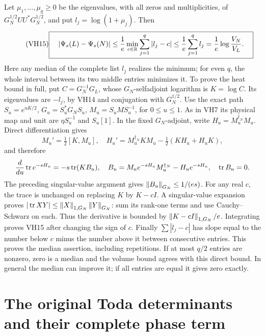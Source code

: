 Let \(\mu_1,\ldots,\mu_q\ge0\) be the eigenvalues, with all zeros
and multiplicities, of \(G_N^{1/2}UU^*G_N^{1/2}\), and put
\(l_j=\log(1+\mu_j)\). Then
\begin{equation}\tag{VH15}\label{hvh:VH15}
\boxed{\quad
|\Psi_s(L)-\Psi_s(N)|
\le\frac1e\min_{c\in\mathbb R}\sum_{j=1}^q|l_j-c|
\le\frac1e\sum_{j=1}^q l_j
=\frac1e\log\frac{V_N}{V_L}.\quad}
\end{equation}
Here any median of the complete list \(l_j\) realizes the minimum;
for even \(q\), the whole interval between its two middle entries
minimizes it. To prove the heat bound in full, put
\(C=G_N^{-1}G_L\), whose \(G_N\)-selfadjoint logarithm is
\(K=\log C\). Its eigenvalues are \(-l_j\), by VH14 and conjugation
with \(G_N^{1/2}\). Use the exact path
\(S_u=e^{uK/2}\), \(G_u=S_u^*G_NS_u\), \(M_u=S_uMS_u^{-1}\),
for \(0\le u\le1\). As in VH7 its physical map and unit are
\(\eta S_u^{-1}\) and \(S_u[1]\).
In the fixed \(G_N\)-adjoint, write \(H_u=M_u^{\dagger_N}M_u\).
Direct differentiation gives
\[
M_u'=\tfrac12[K,M_u],\quad
H_u'=M_u^{\dagger_N}KM_u-\tfrac12(KH_u+H_uK),
\]
and therefore
\[
\frac d{du}\operatorname{tr} e^{-sH_u}=-s\operatorname{tr}(KB_u),\quad
B_u=M_u e^{-sH_u}M_u^{\dagger_N}-H_u e^{-sH_u},\quad\operatorname{tr} B_u=0.
\]
The preceding singular-value argument gives \(\left\lVert B_u\right\rVert_{G_N}\le1/(es)\).
For any real \(c\), the trace is unchanged on replacing \(K\) by
\(K-cI\). A singular-value expansion proves
\(|\operatorname{tr} XY|\le\left\lVert X\right\rVert_{1,G_N}\left\lVert Y\right\rVert_{G_N}\): sum its rank-one terms
and use Cauchy--Schwarz on each. Thus the derivative is bounded by
\(\left\lVert K-cI\right\rVert_{1,G_N}/e\). Integrating proves VH15 after changing
the sign of \(c\). Finally \(\sum|l_j-c|\) has slope equal to the
number below \(c\) minus the number above it between consecutive
entries. This proves the median assertion, including repetitions.
If at most \(q/2\) entries are nonzero, zero is a median and the
volume bound agrees with this direct bound. In general the median
can improve it; if all entries are equal it gives zero exactly.

\section{The original Toda determinants and their complete phase term}

